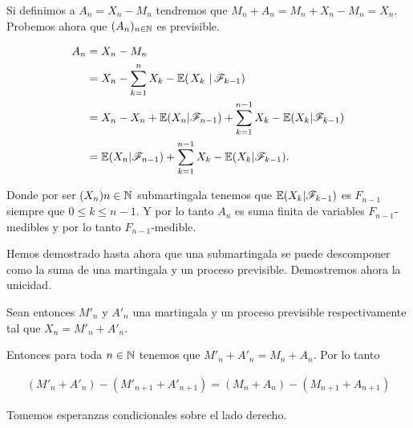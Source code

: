 Si definimos a $A_n = X_n - M_n$ tendremos que $M_n + A_n = M_n + X_n - M_n = X_n$. Probemos ahora que
$(A_n)_{n \in \mathbb{N}}$ es previsible.\par\null

\begin{align}
    A_n     &=      X_n - M_n                                                                   \\
            &=      X_n - \sum_{k=1}^n X_k-\espc{X_k}{\F_{k-1}}                                 \\
            &=      X_n - X_n + \E(X_n | \F_{n-1}) + \sum_{k=1}^{n-1} X_k-\E(X_k|\F_{k-1})      \\     
            &=      \E(X_n | \F_{n-1}) + \sum_{k=1}^{n-1} X_k-\E(X_k|\F_{k-1}).     
\end{align}\par\null

Donde por ser $(X_n){n \in \mathbb{N}}$ submartingala tenemos que $\mathbb{E}(X_k|\mathscr{F}_{k-1})$ es $F_{n-1}$ siempre que $0 \leq k \leq n-1$.
Y por lo tanto $A_n$ es suma finita de variables $F_{n-1}$-medibles y por lo tanto $F_{n-1}$-medible.\par\null

Hemos demostrado hasta ahora que una submartingala se puede descomponer como la suma de una martingala y un proceso previsible.
Demostremos ahora la unicidad.\par\null

Sean entonces $M'_n$ y $A'_n$ una martingala y un proceso previsible respectivamente tal que $X_n = M'_n + A'_n$.\par\null

Entonces para toda $n \in \mathbb{N}$ tenemos que $M'_n + A'_n = M_n + A_n$. Por lo tanto 

\begin{align}
    (M'_n + A'_n) - (M'_{n+1} + A'_{n+1}) = (M_n + A_n) - (M_{n+1} + A_{n+1})
\end{align}\par\null

Tomemos esperanzas condicionales sobre el lado derecho.

